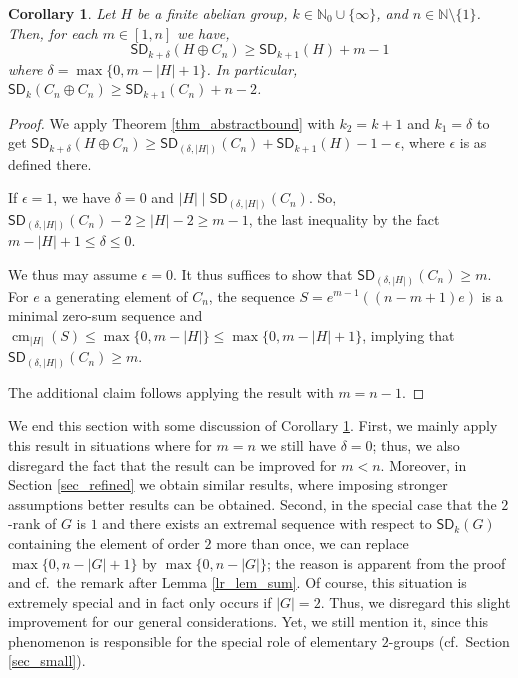 \documentclass{amsart}
\newtheorem{co}[thm]{Corollary}
\theoremstyle{definition}
\numberwithin{equation}{section}
\begin{document}
\begin{co}
\label{lr_lem_maintech}
Let $H$ be a finite abelian group, $k\in \mathbb{N}_0 \cup \{ \infty \}$, and $n \in \mathbb{N}\setminus \{1\}$.
Then, for each $m\in [1,n]$ we have,
\[{\mathsf{SD}}_{k+\delta}(H\oplus C_n) \ge {\mathsf{SD}}_{k+1}(H)+m-1\]
where $\delta= \max \{0, m - |H| +1\}$.
In particular, ${\mathsf{SD}}_k(C_n\oplus C_n)\ge {\mathsf{SD}}_{k+1}(C_n)+n-2$.
\end{co}
\begin{proof}
We apply Theorem \ref{thm_abstractbound} with $k_2= k+1$ and $k_1 = \delta $ to get
${\mathsf{SD}}_{k+\delta}(H\oplus C_n) \ge {\mathsf{SD}}_{(\delta, |H|)}(C_n) + {\mathsf{SD}}_{k+1}(H)-1-\epsilon$, where $\epsilon$ is as defined there.

If $\epsilon=1$, we have $\delta=0$ and  $|H|\mid {\mathsf{SD}}_{(\delta,|H|)}(C_n)$. So,
 ${\mathsf{SD}}_{(\delta,|H|)}(C_n)-2 \ge |H|-2\ge m-1$, the last inequality by the fact $m-|H|+1\le \delta\le 0$.

We thus may assume $\epsilon=0$. It thus suffices to show that ${\mathsf{SD}}_{(\delta,|H|)}(C_n)\ge m$.
For $e$ a generating element of $C_n$, the sequence
$S=e^{m-1}((n-m+1)e)$ is a minimal zero-sum sequence and $\operatorname{cm}_{|H|}(S) \le \max \{0,m- |H|\}\le \max \{0,m- |H|+1\}$, implying that ${\mathsf{SD}}_{(\delta, |H|)}(C_n)\ge m$.

The additional claim follows applying the result with $m=n-1$.
\end{proof}

We end this section with some discussion of Corollary \ref{lr_lem_maintech}.
First, we mainly apply this result in situations where for $m=n$ we still have $\delta=0$; thus,
we also disregard the fact that the result can be improved for $m<n$. Moreover, in Section \ref{sec_refined} we obtain similar results, where imposing stronger assumptions better results can be obtained.
Second, in the special case that the $2$-rank of $G$ is $1$ and there exists an extremal sequence with respect to ${\mathsf{SD}}_k(G)$ containing the element of order $2$ more than once, we can replace $\max \{0, n - |G|+1\}$ by $\max \{0, n - |G|\}$; the reason is apparent from the proof and cf.~the remark after Lemma \ref{lr_lem_sum}.
Of course, this situation is extremely special and in fact only occurs if
$|G|=2$.
Thus, we disregard this slight improvement for our general considerations.  Yet, we still mention it, since this phenomenon is responsible for the special role of elementary $2$-groups (cf.~Section \ref{sec_small}).
\end{document}
